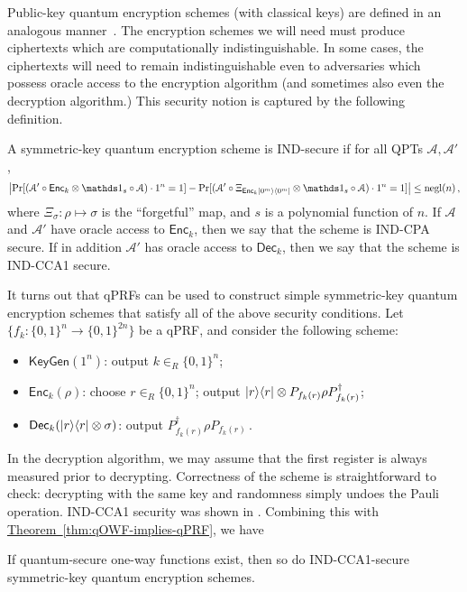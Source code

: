 \documentclass[envcountsame]{llncs}
\numberwithin{equation}{section}
\newcommand{\one}{\mathds 1}
\newcommand{\opn}{\operatorname}
\newcommand{\expref}[2]{\texorpdfstring{\hyperref[#2]{#1~\ref{#2}}}{#1~\ref{#2}}}
\newcommand{\algo}{\mathcal}
\newcommand{\negl}{\opn{negl}}
\newcommand{\KeyGen}{\ensuremath{\mathsf{KeyGen}}\xspace}
\newcommand{\Enc}{\ensuremath{\mathsf{Enc}}\xspace}
\newcommand{\Dec}{\ensuremath{\mathsf{Dec}}\xspace}
\newcommand{\inrand}{\in_R}
\newcommand{\prob}{\opn{Pr}}
\begin{document}
Public-key quantum encryption schemes (with classical keys) are defined in an analogous manner~\cite{BJ15}. The encryption schemes we will need must produce ciphertexts which are computationally indistinguishable. In some cases, the ciphertexts will need to remain indistinguishable even to adversaries which possess oracle access to the encryption algorithm (and sometimes also even the decryption algorithm.) This security notion is captured by the following definition.

\begin{definition}\label{def:IND}
A symmetric-key quantum encryption scheme is IND-secure if for all QPTs $\algo A, \algo A'$,
$$
\left|\prob[ (\algo A' \circ \Enc_k \otimes \one_s \circ \algo A) \cdot 1^n = 1] -
\prob[ (\algo A' \circ \Xi_{\Enc_k \ket{0^m}\bra{0^m}} \otimes \one_s \circ \algo A) \cdot 1^n = 1] \right|
\leq \negl(n)\,,
$$ 
where $\Xi_\sigma: \rho \mapsto \sigma$ is the ``forgetful'' map, and $s$ is a polynomial function of $n$. If $\algo A$ and $\algo A'$ have oracle access to $\Enc_k$, then we say that the scheme is IND-CPA secure. If in addition $\algo A'$ has oracle access to $\Dec_k$, then we say that the scheme is IND-CCA1 secure.
\end{definition}

It turns out that qPRFs can be used to construct simple symmetric-key quantum encryption schemes that satisfy all of the above security conditions. Let $\{f_k : \{0, 1\}^n \rightarrow \{0, 1\}^{2n}\}$ be a qPRF, and consider the following scheme:
\begin{itemize}
\item $\KeyGen(1^n)$: output $k \inrand \{0, 1\}^n$;
\item $\Enc_k(\rho)$: choose $r \inrand \{0, 1\}^n$; output ${\left\vert{r}\right\rangle}{\left\langle{r}\right\vert} \otimes P_{f_k(r)} \rho P_{f_k(r)}^{\dagger}$;
\item $\Dec_k(\ket{r}\bra{r} \otimes \sigma)$: output  $P_{f_k(r)}^\dagger \rho P_{f_k(r)}$\,.
\end{itemize}
In the decryption algorithm, we may assume that the first register is always measured prior to decrypting. Correctness of the scheme is straightforward to check: decrypting with the same key and randomness simply undoes the Pauli operation. IND-CCA1 security was shown in \cite{ABFGSS16}. Combining this with \expref{Theorem}{thm:qOWF-implies-qPRF}, we have 
\begin{theorem}\label{thm:qOWF-implies-qSKE}
If quantum-secure one-way functions exist, then so do IND-CCA1-secure symmetric-key quantum encryption schemes.
\end{theorem}
\end{document}
